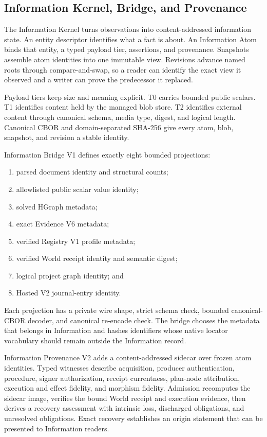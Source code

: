 \documentclass[11pt,oneside]{article}
\begin{document}
\subsection{Information Kernel, Bridge, and Provenance}
\label{sec:information}

The Information Kernel turns observations into content-addressed information
state. An entity descriptor identifies what a fact is about. An Information
Atom binds that entity, a typed payload tier, assertions, and provenance.
Snapshots assemble atom identities into one immutable view. Revisions advance
named roots through compare-and-swap, so a reader can identify the exact view
it observed and a writer can prove the predecessor it replaced.

Payload tiers keep size and meaning explicit. T0 carries bounded public
scalars. T1 identifies content held by the managed blob store. T2 identifies
external content through canonical schema, media type, digest, and logical
length. Canonical CBOR and domain-separated SHA-256 give every atom, blob,
snapshot, and revision a stable identity.

Information Bridge V1 defines exactly eight bounded projections:

\begin{enumerate}
  \item parsed document identity and structural counts;
  \item allowlisted public scalar value identity;
  \item solved HGraph metadata;
  \item exact Evidence V6 metadata;
  \item verified Registry V1 profile metadata;
  \item verified World receipt identity and semantic digest;
  \item logical project graph identity; and
  \item Hosted V2 journal-entry identity.
\end{enumerate}

Each projection has a private wire shape, strict schema check, bounded
canonical-CBOR decoder, and canonical re-encode check. The bridge chooses the
metadata that belongs in Information and hashes identifiers whose native
locator vocabulary should remain outside the Information record.

Information Provenance V2 adds a content-addressed sidecar over frozen atom
identities. Typed witnesses describe acquisition, producer authentication,
procedure, signer authorization, receipt currentness, plan-node attribution,
execution and effect fidelity, and morphism fidelity. Admission recomputes the
sidecar image, verifies the bound World receipt and execution evidence, then
derives a recovery assessment with intrinsic loss, discharged obligations,
and unresolved obligations. Exact recovery establishes an origin statement
that can be presented to Information readers.
\end{document}
